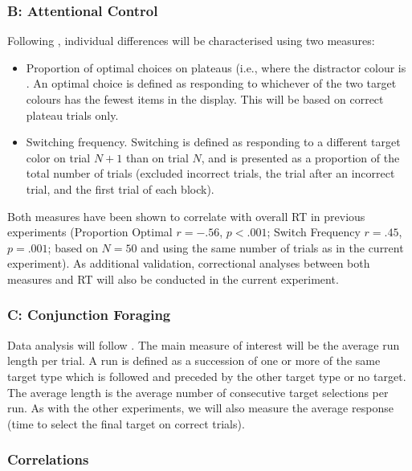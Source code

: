 \documentclass[a4paper, oneside, 11pt, onecolumn]{article}
\begin{document}
\subsubsection{B: Attentional Control}

Following \cite{irons-leber2016}, individual differences will be characterised using two measures: 
\begin{itemize}
\item Proportion of optimal choices on plateaus (i.e., where the distractor colour is . An optimal choice is defined as responding to whichever of the two target colours has the fewest items in the display. This will be based on correct plateau trials only. \\
\item Switching frequency. Switching is defined as responding to a different target color on trial $N+1$ than on trial $N$, and is presented as a proportion of the total number of trials (excluded incorrect trials, the trial after an incorrect trial, and the first trial of each block).\\
\end{itemize}

Both measures have been shown to correlate with overall RT in previous experiments (Proportion Optimal $r =-.56$, $p < .001$; Switch Frequency $r = .45$, $p = .001$; based on $N = 50$ and using the same number of trials as in the current experiment). As additional validation, correctional analyses between both measures and RT will also be conducted in the current experiment.

\subsubsection{C: Conjunction Foraging}

Data analysis will follow \cite{kristjansson2014,johannesson2016}. The main measure of interest will be the average run length per trial. A run is defined as a succession of one or more of the same target type which is followed and preceded by the other target type or no target. The average length is the average number of consecutive target selections per run. As with the other experiments, we will also measure the average response (time to select the final target on correct trials).


\subsubsection{Correlations}
\end{document}

